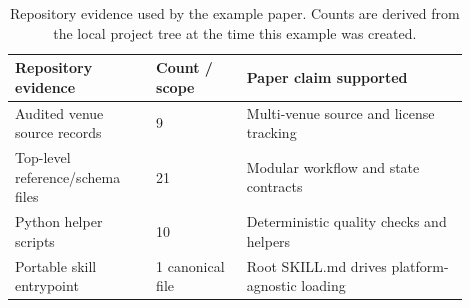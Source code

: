 \begin{table}[t]
\centering
\begin{tabular}{p{0.28\linewidth}p{0.18\linewidth}p{0.44\linewidth}}
\toprule
Repository evidence & Count / scope & Paper claim supported \\
\midrule
Audited venue source records & 9 & Multi-venue source and license tracking \\
Top-level reference/schema files & 21 & Modular workflow and state contracts \\
Python helper scripts & 10 & Deterministic quality checks and helpers \\
Portable skill entrypoint & 1 canonical file & Root SKILL.md drives platform-agnostic loading \\
\bottomrule
\end{tabular}
\caption{Repository evidence used by the example paper. Counts are derived from the local project tree at the time this example was created.}
\label{tab:repository-evidence}
\end{table}
